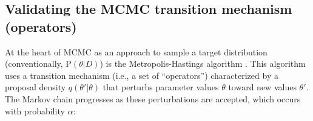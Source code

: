 \documentclass[oneside]{article}
\begin{document}


\subsection*{Validating the MCMC transition mechanism (operators)}

At the heart of MCMC as an approach to sample a target distribution
(conventionally, $\text{P}(\theta|D)$) is
the Metropolis-Hastings algorithm \citep{metropolis53,mh}.
This algorithm uses a transition mechanism (i.e., a set of
``operators'') characterized by a proposal density $q(\theta'|\theta)$
that perturbs parameter values $\theta$ toward new values $\theta'$.
The Markov chain progresses as these perturbations are accepted, which
occurs with probability $\alpha$:
\end{document}
